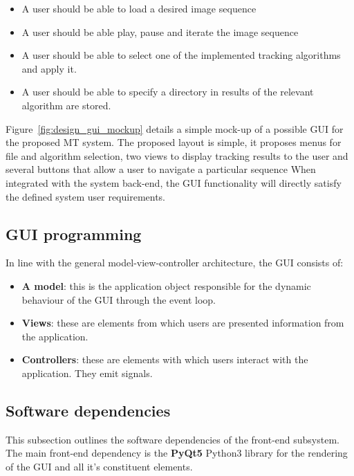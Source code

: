 \begin{itemize}
    \item A user should be able to load a desired image sequence
    \item A user should be able play, pause and iterate the image sequence 
    \item A user should be able to select one of the implemented tracking
        algorithms and apply it.
    \item A user should be able to specify a directory in results of the
        relevant algorithm are stored.
\end{itemize}

Figure~\ref{fig:design_gui_mockup} details a simple mock-up of a possible GUI
for the proposed MT system. The proposed layout is simple, it proposes menus for
file and algorithm selection, two views to display tracking results to the user
and several buttons that allow a user to navigate a particular sequence
When integrated with the system back-end, the GUI functionality will directly
satisfy the defined system user requirements.


\subsection{GUI programming}
In line with the general model-view-controller architecture, the GUI consists
of:
\begin{itemize}
    \item \textbf{A model}: this is the application object responsible for the
        dynamic behaviour of the GUI through the event loop.
    \item \textbf{Views}: these are elements from which users are presented
        information from the application. 
    \item \textbf{Controllers}: these are elements with which users interact with
        the application. They emit signals.
\end{itemize}

\subsection{Software dependencies}
This subsection outlines the software dependencies of the front-end subsystem.
The main front-end dependency is the \textbf{PyQt5} Python3 library for the
rendering of the GUI and all it's constituent elements.

